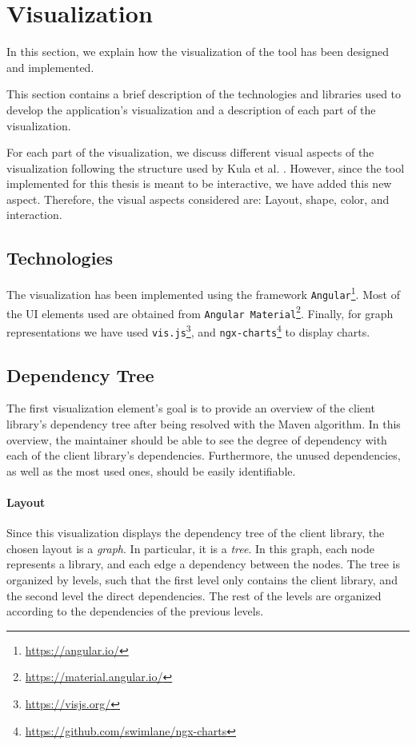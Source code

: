 \section{Visualization}
In this section, we explain how the visualization of the tool has been designed and implemented.

This section contains a brief description of the technologies and libraries used to develop the application's visualization and a description of each part of the visualization.

For each part of the visualization, we discuss different visual aspects of the visualization following the structure used by Kula et al. \cite{kula2014visualizing}. However, since the tool implemented for this thesis is meant to be interactive, we have added this new aspect. Therefore, the visual aspects considered are: Layout, shape, color, and interaction.

\subsection{Technologies}
The visualization has been implemented using the framework \texttt{Angular}\footnote{\url{https://angular.io/}}. Most of the UI elements used are obtained from \texttt{Angular Material}\footnote{\url{https://material.angular.io/}}. Finally, for graph representations we have used \texttt{vis.js}\footnote{\url{https://visjs.org/}}, and \texttt{ngx-charts}\footnote{\url{https://github.com/swimlane/ngx-charts}} to display charts.

\subsection{Dependency Tree}\label{sec:visualization-dependency-tree}
The first visualization element's goal is to provide an overview of the client library's dependency tree after being resolved with the Maven algorithm. In this overview, the maintainer should be able to see the degree of dependency with each of the client library's dependencies. Furthermore, the unused dependencies, as well as the most used ones, should be easily identifiable.

\paragraph{Layout}
Since this visualization displays the dependency tree of the client library, the chosen layout is a \textit{graph}. In particular, it is a \textit{tree}. In this graph, each node represents a library, and each edge a dependency between the nodes. The tree is organized by levels, such that the first level only contains the client library, and the second level the direct dependencies. The rest of the levels are organized according to the dependencies of the previous levels.

